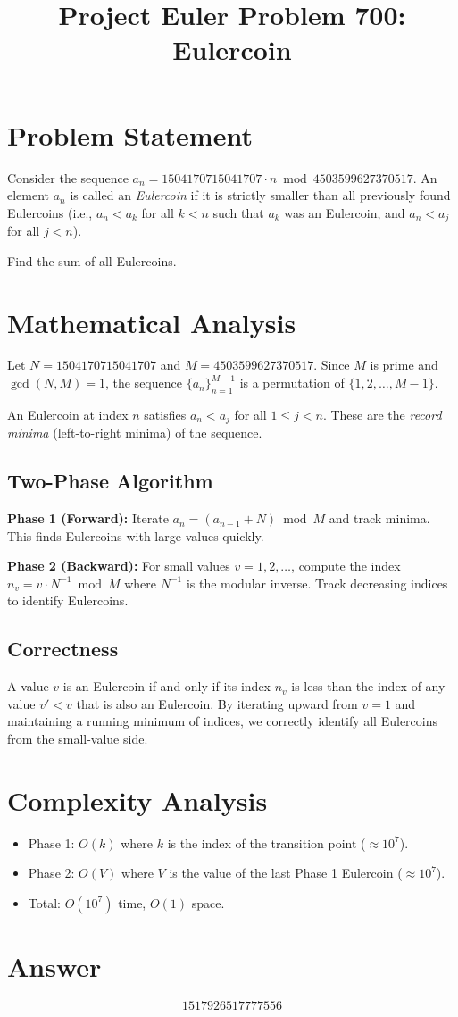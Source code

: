 \documentclass[12pt]{article}
\title{Project Euler Problem 700: Eulercoin}
\author{}
\date{}
\begin{document}
\maketitle

\section{Problem Statement}
Consider the sequence $a_n = 1504170715041707 \cdot n \bmod 4503599627370517$.
An element $a_n$ is called an \emph{Eulercoin} if it is strictly smaller than all previously found Eulercoins (i.e., $a_n < a_k$ for all $k < n$ such that $a_k$ was an Eulercoin, and $a_n < a_j$ for all $j < n$).

Find the sum of all Eulercoins.

\section{Mathematical Analysis}

Let $N = 1504170715041707$ and $M = 4503599627370517$. Since $M$ is prime and $\gcd(N, M) = 1$, the sequence $\{a_n\}_{n=1}^{M-1}$ is a permutation of $\{1, 2, \ldots, M-1\}$.

An Eulercoin at index $n$ satisfies $a_n < a_j$ for all $1 \le j < n$. These are the \emph{record minima} (left-to-right minima) of the sequence.

\subsection{Two-Phase Algorithm}

\textbf{Phase 1 (Forward):} Iterate $a_n = (a_{n-1} + N) \bmod M$ and track minima. This finds Eulercoins with large values quickly.

\textbf{Phase 2 (Backward):} For small values $v = 1, 2, \ldots$, compute the index $n_v = v \cdot N^{-1} \bmod M$ where $N^{-1}$ is the modular inverse. Track decreasing indices to identify Eulercoins.

\subsection{Correctness}
A value $v$ is an Eulercoin if and only if its index $n_v$ is less than the index of any value $v' < v$ that is also an Eulercoin. By iterating upward from $v = 1$ and maintaining a running minimum of indices, we correctly identify all Eulercoins from the small-value side.

\section{Complexity Analysis}
\begin{itemize}
    \item Phase 1: $O(k)$ where $k$ is the index of the transition point ($\approx 10^7$).
    \item Phase 2: $O(V)$ where $V$ is the value of the last Phase 1 Eulercoin ($\approx 10^7$).
    \item Total: $O(10^7)$ time, $O(1)$ space.
\end{itemize}

\section{Answer}

\[
\boxed{1517926517777556}
\]
\end{document}
